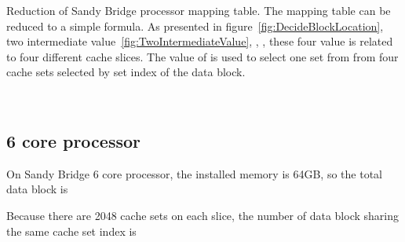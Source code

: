\documentclass[conference]{IEEEtran}
\newcommand{\SandyBridge}{Sandy Bridge }
\begin{document}
Reduction of \SandyBridge processor mapping table. The mapping table can be reduced to a simple formula. 
As presented in figure~\ref{fig:DecideBlockLocation}, two intermediate value~\ref{fig:TwoIntermediateValue}, , , these four value is related to four different cache slices. The value of  is used to select one set from from four cache sets selected by set index of the data block. 
\begin{figure*}[!htbp]
\centering
{}
	~
	\caption{Intel Sandy Bridge 4 core processor hash fucntion cracking result.}
\end{figure*}
\subsection{6 core processor}
On \SandyBridge 6 core processor, the installed memory is 64GB, so the total data block is 

Because there are 2048 cache sets on each slice, the number of data block sharing the same cache set index is 
\end{document}
